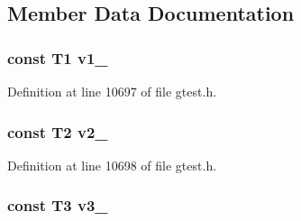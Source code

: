 \subsection{\-Member \-Data \-Documentation}
\hypertarget{classtesting_1_1internal_1_1ValueArray4_aac1d0654cc6c1aceb4a5d0fa7a98042e}{
\subsubsection[{v1\-\_\-}]{\setlength{\rightskip}{0pt plus 5cm}const \-T1 {\bf v1\-\_\-}}}\label{dc/dea/classtesting_1_1internal_1_1ValueArray4_aac1d0654cc6c1aceb4a5d0fa7a98042e}


\-Definition at line 10697 of file gtest.\-h.

\hypertarget{classtesting_1_1internal_1_1ValueArray4_a9f0a8ce6ce2fd27e980c4c51a7a7256a}{
\subsubsection[{v2\-\_\-}]{\setlength{\rightskip}{0pt plus 5cm}const \-T2 {\bf v2\-\_\-}}}\label{dc/dea/classtesting_1_1internal_1_1ValueArray4_a9f0a8ce6ce2fd27e980c4c51a7a7256a}


\-Definition at line 10698 of file gtest.\-h.

\hypertarget{classtesting_1_1internal_1_1ValueArray4_a4f8257321a2eab0456239174d6712d5e}{
\subsubsection[{v3\-\_\-}]{\setlength{\rightskip}{0pt plus 5cm}const \-T3 {\bf v3\-\_\-}}}\label{dc/dea/classtesting_1_1internal_1_1ValueArray4_a4f8257321a2eab0456239174d6712d5e}


